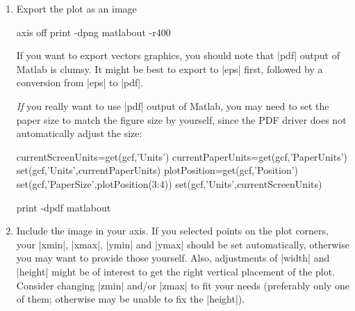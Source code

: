 {{\begin{enumerate}
\begin{codeexample}
txt = {['X: ',num2str(pos(1))],['Y: ',num2str(pos(2))],['Z: ',num2str(pos(3))]};
\end{codeexample}
        Run |pgfplotscsconversion|, click on four points in your plot.
        Preferably select non-colinear points near the edges of the plot. Copy
        and paste the four lines that were written to the Matlab command
        window.

        Make sure that the first two points have different $X$ and $Y$ values
        on screen (i.e.\@ image canvas coordinates).
    \item Export the plot as an image
\begin{codeexample}
axis off
print -dpng matlabout -r400 %
\end{codeexample}

        If you want to export vectors graphics, you should note that |pdf|
        output of Matlab is clumsy. It might be best to export to |eps| first,
        followed by a conversion from |eps| to |pdf|.

        \emph{If} you really want to use |pdf| output of Matlab, you may need
        to set the paper size to match the figure size by yourself, since the
        PDF driver does not automatically adjust the size:
\begin{codeexample}
currentScreenUnits=get(gcf,'Units')     %
currentPaperUnits=get(gcf,'PaperUnits') %
set(gcf,'Units',currentPaperUnits)      %
plotPosition=get(gcf,'Position')        %
set(gcf,'PaperSize',plotPosition(3:4))  %
set(gcf,'Units',currentScreenUnits)     %

print -dpdf matlabout      %
\end{codeexample}
    \item Include the image in your \PGFPlots{} axis. If you selected points
        on the plot corners, your |xmin|, |xmax|, |ymin| and |ymax| should be
        set automatically, otherwise you may want to provide those yourself.
        Also, adjustments of |width| and |height| might be of interest to get
        the right vertical placement of the plot. Consider changing |zmin|
        and/or |zmax| to fit your needs (preferably only one of them;
        otherwise \PGFPlots{} may be unable to fix the |height|).
\end{enumerate}

}}
